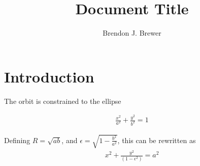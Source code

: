 \documentclass[letterpaper, 11pt]{article}
\title{Document Title}
\author{Brendon J. Brewer}
\begin{document}
\maketitle

\section{Introduction}

The orbit is constrained to the ellipse

\begin{eqnarray}
\frac{x^2}{a^2} + \frac{y^2}{b^2} = 1
\end{eqnarray}

Defining $R=\sqrt{ab}$, and $\epsilon = \sqrt{1 - \frac{b^2}{a^2}}$, this can be
rewritten as
\begin{eqnarray}
x^2 + \frac{y^2}{(1-\epsilon^2)} = a^2
\end{eqnarray}
\end{document}
